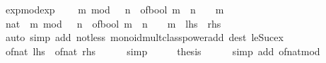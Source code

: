 \begin{isabellebody}
\isanewline
{}\isamarkupfalse%
%
\endisatagproof
{\isafoldproof}%
%
\isadelimproof
\isanewline
%
\endisadelimproof
\isanewline
{}\isamarkupfalse%
\ exp{\isacharunderscore}{\kern0pt}mod{\isacharunderscore}{\kern0pt}exp{\isacharcolon}{\kern0pt}\isanewline
\ \ {\isacartoucheopen}{}\ {\isacharcircum}{\kern0pt}\ m\ mod\ {}\ {\isacharcircum}{\kern0pt}\ n\ {\isacharequal}{\kern0pt}\ of{\isacharunderscore}{\kern0pt}bool\ {\isacharparenleft}{\kern0pt}m\ {\isacharless}{\kern0pt}\ n{\isacharparenright}{\kern0pt}\ {\isacharasterisk}{\kern0pt}\ {}\ {\isacharcircum}{\kern0pt}\ m{\isacartoucheclose}\isanewline
%
\isadelimproof
%
\endisadelimproof
%
\isatagproof
{}\isamarkupfalse%
\ {\isacharminus}{\kern0pt}\isanewline
\ \ \isamarkupfalse%
\ {\isacartoucheopen}{\isacharparenleft}{\kern0pt}{}{\isacharcolon}{\kern0pt}{\isacharcolon}{\kern0pt}nat{\isacharparenright}{\kern0pt}\ {\isacharcircum}{\kern0pt}\ m\ mod\ {}\ {\isacharcircum}{\kern0pt}\ n\ {\isacharequal}{\kern0pt}\ of{\isacharunderscore}{\kern0pt}bool\ {\isacharparenleft}{\kern0pt}m\ {\isacharless}{\kern0pt}\ n{\isacharparenright}{\kern0pt}\ {\isacharasterisk}{\kern0pt}\ {}\ {\isacharcircum}{\kern0pt}\ m{\isacartoucheclose}\ {\isacharparenleft}{\kern0pt}\ {\isacartoucheopen}{\isacharquery}{\kern0pt}lhs\ {\isacharequal}{\kern0pt}\ {\isacharquery}{\kern0pt}rhs{\isacartoucheclose}{\isacharparenright}{\kern0pt}\isanewline
\ \ \ \ \isamarkupfalse%
\ {\isacharparenleft}{\kern0pt}auto\ simp\ add{\isacharcolon}{\kern0pt}\ not{\isacharunderscore}{\kern0pt}less\ monoid{\isacharunderscore}{\kern0pt}mult{\isacharunderscore}{\kern0pt}class{\isachardot}{\kern0pt}power{\isacharunderscore}{\kern0pt}add\ dest{\isacharbang}{\kern0pt}{\isacharcolon}{\kern0pt}\ le{\isacharunderscore}{\kern0pt}Suc{\isacharunderscore}{\kern0pt}ex{\isacharparenright}{\kern0pt}\isanewline
\ \ \isamarkupfalse%
\ \isamarkupfalse%
\ {\isacartoucheopen}of{\isacharunderscore}{\kern0pt}nat\ {\isacharquery}{\kern0pt}lhs\ {\isacharequal}{\kern0pt}\ of{\isacharunderscore}{\kern0pt}nat\ {\isacharquery}{\kern0pt}rhs{\isacartoucheclose}\isanewline
\ \ \ \ \isamarkupfalse%
\ simp\isanewline
\ \ \isamarkupfalse%
\ \isamarkupfalse%
\ {\isacharquery}{\kern0pt}thesis\isanewline
\ \ \ \ \isamarkupfalse%
\ {\isacharparenleft}{\kern0pt}simp\ add{\isacharcolon}{\kern0pt}\ of{\isacharunderscore}{\kern0pt}nat{\isacharunderscore}{\kern0pt}mod{\isacharparenright}{\kern0pt}\isanewline

\end{isabellebody}
